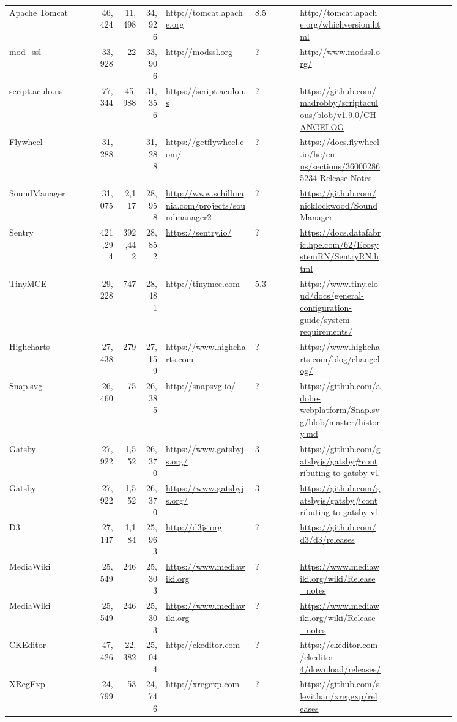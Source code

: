 \begin{longtable}{|p{0.2\linewidth}|r|r|r|p{0.2\linewidth}|p{0.1\linewidth}|p{0.2\linewidth}|p{0.15\linewidth}|}
	Apache Tomcat &46,424 &11,498 &34,926 &\url{http://tomcat.apache.org} &8.5 &\url{http://tomcat.apache.org/whichversion.html} \\
	mod\_ssl &33,928 &22 &33,906 &\url{http://modssl.org} &? &\url{http://www.modssl.org/} \\
	\url{script.aculo.us} &77,344 &45,988 &31,356 &\url{https://script.aculo.us} &? &\url{https://github.com/madrobby/scriptaculous/blob/v1.9.0/CHANGELOG} \\
	Flywheel &31,288 & &31,288 &\url{https://getflywheel.com/} &? &\url{https://docs.flywheel.io/hc/en-us/sections/360002865234-Release-Notes} \\
	SoundManager &31,075 &2,117 &28,958 &\url{http://www.schillmania.com/projects/soundmanager2} &? &\url{https://github.com/nicklockwood/SoundManager} \\
	Sentry &421,294 &392,442 &28,852 &\url{https://sentry.io/} &? &\url{https://docs.datafabric.hpe.com/62/EcosystemRN/SentryRN.html} \\
	TinyMCE &29,228 &747 &28,481 &\url{http://tinymce.com} &5.3 &\url{https://www.tiny.cloud/docs/general-configuration-guide/system-requirements/} \\
	Highcharts &27,438 &279 &27,159 &\url{https://www.highcharts.com} &? &\url{https://www.highcharts.com/blog/changelog/} \\
	Snap.svg &26,460 &75 &26,385 &\url{http://snapsvg.io/} &? &\url{https://github.com/adobe-webplatform/Snap.svg/blob/master/history.md} \\
	Gatsby &27,922 &1,552 &26,370 &\url{https://www.gatsbyjs.org/} &3 &\url{https://github.com/gatsbyjs/gatsby\#contributing-to-gatsby-v1} \\
	Gatsby &27,922 &1,552 &26,370 &\url{https://www.gatsbyjs.org/} &3 &\url{https://github.com/gatsbyjs/gatsby\#contributing-to-gatsby-v1} \\
	D3 &27,147 &1,184 &25,963 &\url{http://d3js.org} &? &\url{https://github.com/d3/d3/releases} \\
	MediaWiki &25,549 &246 &25,303 &\url{https://www.mediawiki.org} &? &\url{https://www.mediawiki.org/wiki/Release\_notes} \\
	MediaWiki &25,549 &246 &25,303 &\url{https://www.mediawiki.org} &? &\url{https://www.mediawiki.org/wiki/Release\_notes} \\
	CKEditor &47,426 &22,382 &25,044 &\url{http://ckeditor.com} &? &\url{https://ckeditor.com/ckeditor-4/download/releases/} \\
	XRegExp &24,799 &53 &24,746 &\url{http://xregexp.com} &? &\url{https://github.com/slevithan/xregexp/releases} \\

\end{longtable}
